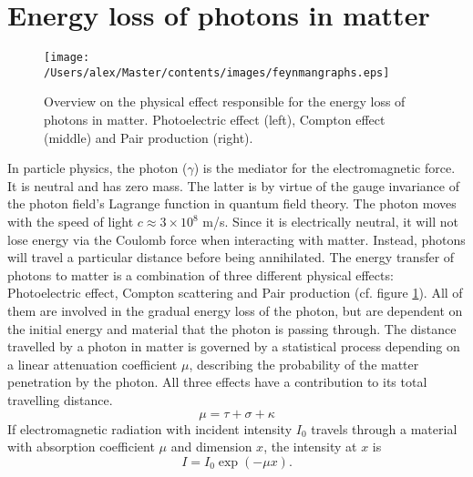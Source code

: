 
\section{Energy loss of photons in matter}
\begin{figure}[hbt]
\centering
\texttt{[image: /Users/alex/Master/contents/images/feynmangraphs.eps]}
\caption{Overview on the physical effect responsible for the energy loss of photons in matter. Photoelectric effect (left), Compton effect (middle) and Pair production (right).}
\label{fig:feynmangraphs}
\end{figure}
In particle physics, the photon ($\gamma$) is the mediator for the electromagnetic force. It is neutral and has zero mass. The latter is by virtue of the gauge invariance of the photon field's Lagrange function in quantum field theory. The photon moves with the speed of light $c \approx 3\times10^8$ m/s. Since it is electrically neutral, it will not lose energy via the Coulomb force when interacting with matter. Instead, photons will travel a particular distance before being annihilated. The energy transfer of photons to matter is a combination of three different physical effects: Photoelectric effect, Compton scattering and Pair production (cf. figure \ref{fig:feynmangraphs}). All of them are involved in the gradual energy loss of the photon, but are dependent on the initial energy and material that the photon is passing through. The distance travelled by a photon in matter is governed by a statistical process depending on a linear attenuation coefficient $\mu$, describing the probability of the matter penetration by the photon. All three effects have a contribution to its total travelling distance.
\begin{equation}
\mu = \tau + \sigma + \kappa
\end{equation}
If electromagnetic radiation with incident intensity $I_0$ travels through a material with absorption coefficient $\mu$ and dimension $x$, the intensity at $x$ is
\begin{equation}
I = I_0 \exp(-\mu x).
\end{equation}

